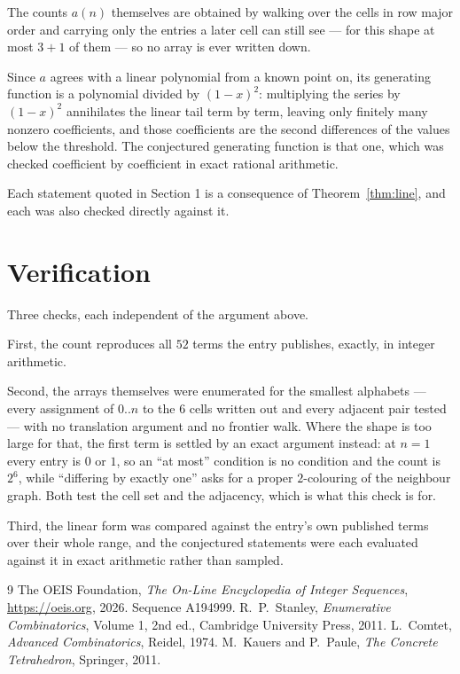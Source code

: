 \documentclass[11pt,a4paper]{article}
\theoremstyle{plain}
\theoremstyle{definition}
\begin{document}
The counts $a(n)$ themselves are obtained by walking over the cells in row major order and
carrying only the entries a later cell can still see --- for this shape at most $3+1$ of
them --- so no array is ever written down.

Since $a$ agrees with a linear polynomial from a known point on, its generating function is a
polynomial divided by $(1-x)^2$: multiplying the series by $(1-x)^2$ annihilates the linear
tail term by term, leaving only finitely many nonzero coefficients, and those coefficients are
the second differences of the values below the threshold. The conjectured generating function
is that one, which was checked coefficient by coefficient in exact rational arithmetic.

Each statement quoted in Section 1 is a consequence of Theorem~\ref{thm:line}, and each was
also checked directly against it.

\section{Verification}

Three checks, each independent of the argument above.

First, the count reproduces all $52$ terms the entry publishes, exactly, in integer
arithmetic.

Second, the arrays themselves were enumerated for the smallest alphabets --- every assignment
of $0..n$ to the $6$ cells written out and every adjacent pair tested --- with no
translation argument and no frontier walk. Where the shape is too large for that, the first
term is settled by an exact argument instead: at $n=1$ every entry is $0$ or $1$, so an ``at
most'' condition is no condition and the count is $2^{6}$, while ``differing by exactly
one'' asks for a proper $2$-colouring of the neighbour graph. Both test the cell set and the
adjacency, which is what this check is for.

Third, the linear form was compared against the entry's own published terms over their whole
range, and the conjectured statements were each evaluated against it in exact arithmetic
rather than sampled.

\begin{thebibliography}{9}
 The OEIS Foundation, \emph{The On-Line Encyclopedia of Integer
Sequences}, \url{https://oeis.org}, 2026. Sequence A194999.
 R.~P.~Stanley, \emph{Enumerative Combinatorics}, Volume 1, 2nd ed.,
Cambridge University Press, 2011.
 L.~Comtet, \emph{Advanced Combinatorics}, Reidel, 1974.
 M.~Kauers and P.~Paule, \emph{The Concrete Tetrahedron}, Springer, 2011.
\end{thebibliography}
\end{document}
